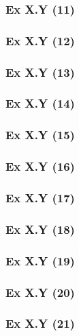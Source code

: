 \newpage		%
%
\subsubsection{Ex X.Y (11)}\label{sec:Ex_X.Y.11}
\subsubsection{Ex X.Y (12)}\label{sec:Ex_X.Y.12}
\subsubsection{Ex X.Y (13)}\label{sec:Ex_X.Y.13}
\subsubsection{Ex X.Y (14)}\label{sec:Ex_X.Y.14}
\subsubsection{Ex X.Y (15)}\label{sec:Ex_X.Y.15}
\subsubsection{Ex X.Y (16)}\label{sec:Ex_X.Y.16}
\subsubsection{Ex X.Y (17)}\label{sec:Ex_X.Y.17}
\subsubsection{Ex X.Y (18)}\label{sec:Ex_X.Y.18}
\subsubsection{Ex X.Y (19)}\label{sec:Ex_X.Y.19}
\subsubsection{Ex X.Y (20)}\label{sec:Ex_X.Y.20}

\newpage		%
%
\subsubsection{Ex X.Y (21)}\label{sec:Ex_X.Y.21}
